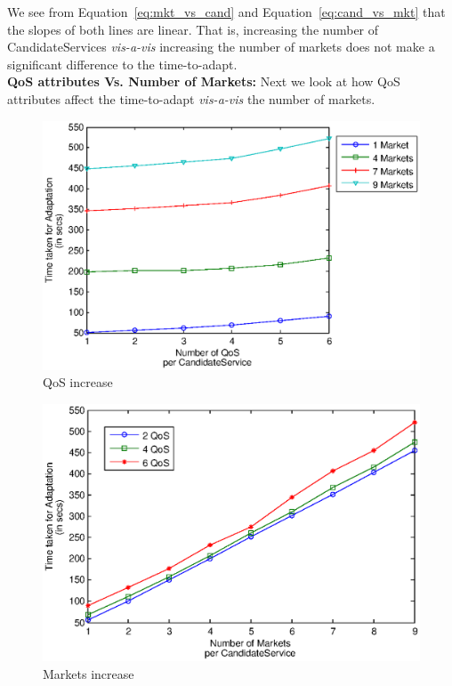 \documentclass[10pt,journal,compsoc]{IEEEtran}
\begin{document}
We see from Equation~\ref{eq:mkt_vs_cand} and Equation~\ref{eq:cand_vs_mkt} that the slopes of both lines are linear. That is, increasing the number of CandidateServices \textit{vis-a-vis} increasing the number of markets does not make a significant difference to the time-to-adapt.\\

\textbf{QoS attributes Vs. Number of Markets:}
Next we look at how QoS attributes affect the time-to-adapt \textit{vis-a-vis} the number of markets. 

\begin{figure}[htbp]
\centering
  \includegraphics[clip, trim=0cm 16.2cm 2cm 4cm, scale=0.45]{Figure21.eps}
  \caption{QoS increase\label{fig:mkt_per_qos}}		
\end{figure}

\begin{figure}
  \centering
  \includegraphics[clip, trim=0cm 16cm 2cm 4cm, scale=0.4]{Figure22.eps}
  \caption{Markets increase \label{fig:qos_per_mkt}}
\end{figure}
\end{document}

